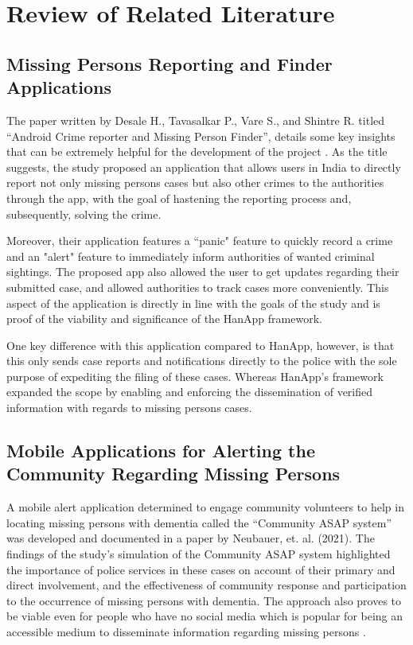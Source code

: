 \chapter{Review of Related Literature}
\label{sec:relatedlit}

\section{Missing Persons Reporting and Finder Applications}

The paper written by Desale H., Tavasalkar P., Vare S., and Shintre R. titled “Android Crime reporter and Missing Person Finder”, details some key insights that can be extremely helpful for the development of the project \cite{desale2020android}. As the title suggests, the study proposed an application that allows users in India to directly report not only missing persons cases but also other crimes to the authorities through the app, with the goal of hastening the reporting process and, subsequently, solving the crime. 

Moreover,  their application features a “panic" feature to quickly record a crime and an "alert" feature to immediately inform authorities of wanted criminal sightings. The proposed app also allowed the user to get updates regarding their submitted case, and allowed authorities to track cases more conveniently.  This aspect of the application is directly in line with the goals of the study and is proof of the viability and significance of the HanApp framework.

One key difference with this application compared to HanApp, however, is that this only sends case reports and notifications directly to the police with the sole purpose of expediting the filing of these cases. Whereas HanApp's framework expanded the scope by enabling and enforcing the dissemination of verified information with regards to missing persons cases.

\section{Mobile Applications for Alerting the Community Regarding Missing Persons}

A mobile alert application determined to engage community volunteers to help in locating missing persons with dementia called the “Community ASAP system” was developed and documented in a paper by Neubauer, et. al. (2021). The findings of the study’s simulation of the Community ASAP system highlighted the importance of police services in these cases on account of their primary and direct involvement, and the effectiveness of community response and participation to the occurrence of missing persons with dementia. The approach also proves to be viable even for people who have no social media which is popular for being an accessible medium to disseminate information regarding missing persons \cite{neubauer2021mobile}.

